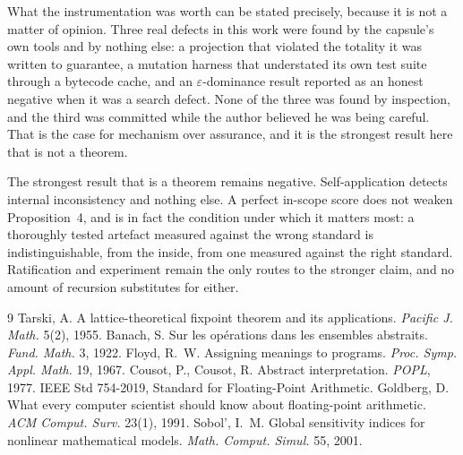 \documentclass[11pt,a4paper]{article}
\theoremstyle{plain}
\theoremstyle{definition}
\theoremstyle{remark}
\begin{document}
What the instrumentation was worth can be stated precisely, because it is not
a matter of opinion. Three real defects in this work were found by the
capsule's own tools and by nothing else: a projection that violated the
totality it was written to guarantee, a mutation harness that understated its
own test suite through a bytecode cache, and an $\varepsilon$-dominance result
reported as an honest negative when it was a search defect. None of the three
was found by inspection, and the third was committed while the author believed
he was being careful. That is the case for mechanism over assurance, and it is
the strongest result here that is not a theorem.

The strongest result that is a theorem remains negative. Self-application
detects internal inconsistency and nothing else. A perfect in-scope score does
not weaken Proposition~4, and is in fact the condition under which it matters
most: a thoroughly tested artefact measured against the wrong standard is
indistinguishable, from the inside, from one measured against the right
standard. Ratification and experiment remain the only routes to the stronger
claim, and no amount of recursion substitutes for either.

\begin{thebibliography}{9}
 Tarski, A. A lattice-theoretical fixpoint theorem and its applications. \emph{Pacific J. Math.} 5(2), 1955.
 Banach, S. Sur les op\'erations dans les ensembles abstraits. \emph{Fund. Math.} 3, 1922.
 Floyd, R.~W. Assigning meanings to programs. \emph{Proc. Symp. Appl. Math.} 19, 1967.
 Cousot, P., Cousot, R. Abstract interpretation. \emph{POPL}, 1977.
 IEEE Std 754-2019, Standard for Floating-Point Arithmetic.
 Goldberg, D. What every computer scientist should know about floating-point arithmetic. \emph{ACM Comput. Surv.} 23(1), 1991.
 Sobol', I.~M. Global sensitivity indices for nonlinear mathematical models. \emph{Math. Comput. Simul.} 55, 2001.
\end{thebibliography}
\end{document}
